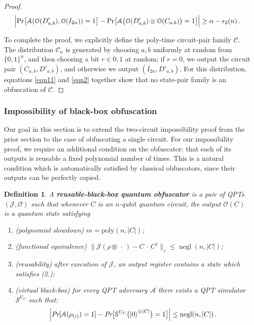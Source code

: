 \documentclass[11pt]{article}
\numberwithin{equation}{section}
\newtheorem{definition}{Definition}
\newcommand{\opn}{\operatorname}
\newcommand{\algo}{\mathcal}
\newcommand{\negl}{\opn{negl}}
\begin{document}
{\begin{proof}
\begin{equation}\label{eqn2}
\Bigl| \text{Pr}\bigl[\mathcal A(\mathcal{O}(D'_{a,b}),\mathcal{O}(I_{2n})) = 1\bigr]
- \text{Pr}\bigl[\mathcal A\bigl(\mathcal{O}(D'_{a,b})\otimes\mathcal{O}(C_{a,b})\bigr) = 1\bigr] \Bigr| 
\geq \alpha-\epsilon_2(n)\,.
\end{equation}

To complete the proof, we explicitly define the poly-time circuit-pair family $\mathcal C$. The distribution $\mathcal C_n$ is generated by choosing $a, b$ uniformly at random from $\{0,1\}^n$, and then choosing a bit $r \in {0, 1}$ at random; if $r = 0$, we output the circuit pair $(C_{a,b}, D'_{a,b})$, and otherwise we output $(I_{2n}, D'_{a,b})$. For this distribution, equations \eqref{eqn11} and \eqref{eqn2} together show that no state-pair family is an obfuscation of $\mathcal C$.
\end{proof}

\subsubsection{Impossibility of black-box obfuscation}

Our goal in this section is to extend the two-circuit impossibility proof from the prior section to the case of obfuscating a single circuit. For our impossibility proof, we require an additional condition on the obfuscator: that each of its outputs is reusable a fixed polynomial number of times. This is a natural condition which is automatically satisfied by classical obfuscators, since their outputs can be perfectly copied.

\begin{definition}\label{def:vbb-reusable}
A \textbf{reusable-black-box quantum obfuscator} is a pair of QPTs $(\algo J, \algo O)$ such that whenever $C$ is an $n$-qubit quantum circuit, the output $\mathcal{O}(C)$ is a quantum state satisfying
\begin{enumerate}
\item (polynomial slowdown)  $m = \text{poly}(n, |C|)$;
\item (functional equivalence) $\bigl\| \algo J ( \rho \otimes \,\cdot\, ) - C \,\cdot\, C^\dagger \bigr\|_\diamond \leq \negl(n, |C|)$;
\item (reusability) after execution of $\algo J$, an output register contains a state which satisfies (2.);
\item (virtual black-box) for every QPT adversary $\mathcal A$ there exists a QPT simulator $\mathcal S^{U_C}$ such that:
$$
\Bigl| \emph{Pr}[\mathcal A(\rho_{(i)}) = 1] - \emph{Pr}\bigl[\mathcal S^{U_C}\bigl(\ket{0}^{\otimes |C|}\bigr) = 1\bigr] \Bigr| \leq \negl(n, |C|)\,.
$$
\end{enumerate}
\end{definition}

}
\end{document}
